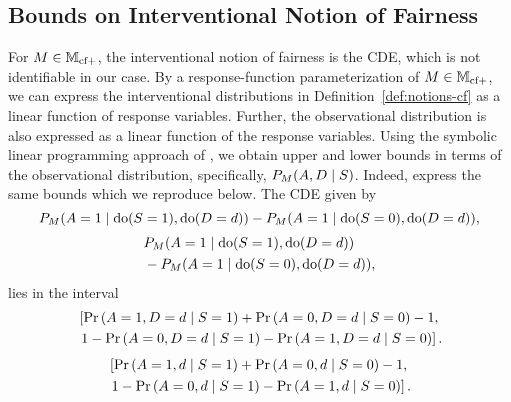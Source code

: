 \subsection{Bounds on Interventional Notion of Fairness}\label{subsec:bounds}
For $M \in \mathbb{M}_{\text{cf}+}$, the interventional notion of fairness is the CDE, which is not identifiable in our case.
By a response-function parameterization \citep{Balke95, BalkePearl97} of $M \in \mathbb{M}_{\text{cf}+}$, we can express the interventional distributions in Definition~\ref{def:notions-cf} as a linear function of response variables. Further, the observational distribution is also expressed as a linear function of the response variables. Using the symbolic linear programming approach of \citet{Balke95}, we obtain upper and lower bounds in terms of the observational distribution, specifically, $P_{M}{\left({A,D \mid S}\right)}$. Indeed, \citet{CaiKPT08} express the same bounds which we reproduce below. The CDE given by
\ifdefined\SINGLE
\begin{equation*}P_{M}{\left({A=1\mid \text{do}(S=1), \text{do}(D=d)}\right)} - P_{M}{\left({A=1\mid \text{do}(S=0), \text{do}(D=d)}\right)},
\end{equation*}
\else
\begin{align*}
&P_{M}{\left({A=1\mid \text{do}(S=1), \text{do}(D=d)}\right)}\\
&- P_{M}{\left({A=1\mid \text{do}(S=0), \text{do}(D=d)}\right)},
\end{align*}
\fi
lies in the interval
\ifdefined\SINGLE
\begin{align*}
    &\left[ \Pr\left(A=1,D=d\mid S=1\right) + \Pr\left(A=0,D=d\mid S=0\right) - 1,\right.\\
    & \left.1 - \Pr\left(A=0,D=d\mid S=1\right) - \Pr\left(A=1,D=d\mid S=0\right)\right].
\end{align*}
\else
\begin{align*}
    &\left[ \Pr\left(A=1,d\mid S=1\right) + \Pr\left(A=0,d\mid S=0\right) - 1,\right.\\
    & \left.1 - \Pr\left(A=0,d\mid S=1\right) -\Pr\left(A=1,d\mid S=0\right)\right].
\end{align*}
